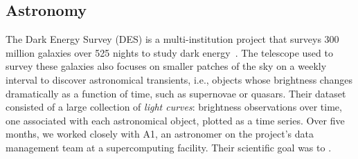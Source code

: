  \subsection{Astronomy}
 \par{} 
 \npar The Dark Energy Survey (DES) is a multi-institution project that surveys 300 million galaxies over 525 nights to study dark energy~\cite{DrlicaWagner2018}. The telescope used to survey these galaxies also focuses on smaller patches of the sky on a weekly interval to discover astronomical transients, i.e., objects whose brightness changes dramatically as a function of time, such as supernovae or quasars. Their dataset consisted of a large collection of \emph{light curves}: brightness observations over time, one associated with each astronomical object, plotted as a time series. Over five months, we worked closely with A1, an astronomer on the project's data management team at a supercomputing facility. Their scientific goal was to . 
